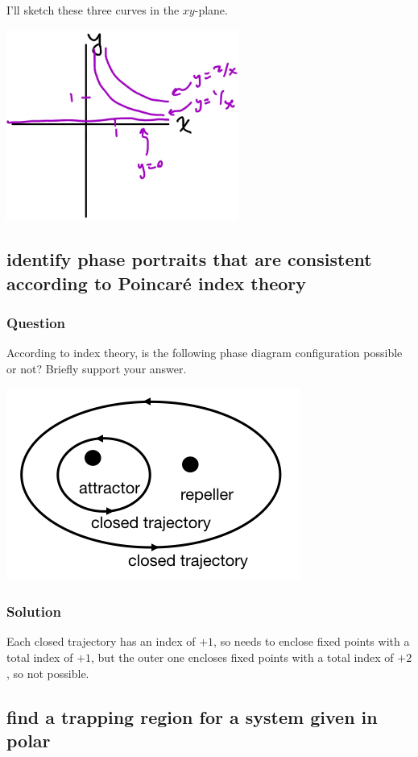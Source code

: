 \documentclass[12pt,letterpaper,noanswers]{exam}
\begin{document}
I'll sketch these three curves in the $xy$-plane.

\includegraphics[width=3in]{img/C12curves.png}

\subsection{identify phase portraits that are consistent according to Poincar\'e index theory}
\subsubsection{Question}
According to index theory, is the following phase diagram configuration possible or not?  Briefly support your answer.

\includegraphics[]{img/C15-2019-10-07p2.png}

\subsubsection{Solution}
Each closed trajectory has an index of $+1$, so needs to enclose fixed points with a total index of $+1$, but the outer one encloses fixed points with a total index of $+2$, so not possible.

\subsection{find a trapping region for a system given in polar}
\end{document}
